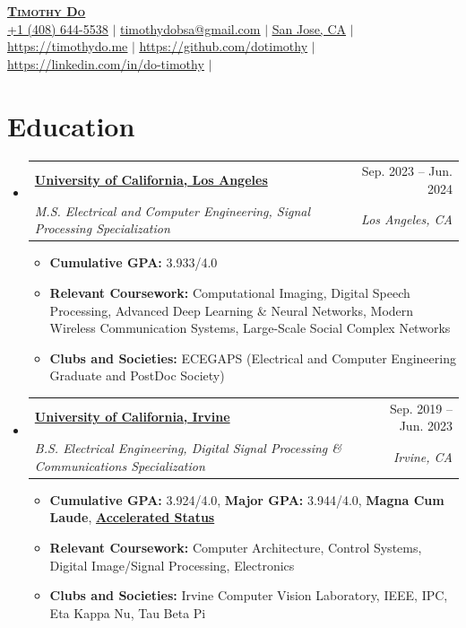 \documentclass[letterpaper,11pt]{article}
\makeatletter
\newcommand{\resumeItem}[1]{
 \item\small{
    {#1 \vspace{-2pt}}
 }
}
\newcommand{\resumeSubheading}[4]{
 \vspace{-2pt}\item
    \begin{tabular*}{0.97\textwidth}[t]{l@{\extracolsep{\fill}}r}
      \textbf{#1} & #2 \\
      \textit{\small#3} & \textit{\small #4} \\
    \end{tabular*}\vspace{-7pt}
}
\newcommand{\resumeSubHeadingListStart}{\begin{itemize}[leftmargin=0.15in, label={}]}
\newcommand{\resumeSubHeadingListEnd}{\end{itemize}\vspace{-7pt}}
\newcommand{\resumeItemListStart}{\begin{itemize}}
\newcommand{\resumeItemListEnd}{\end{itemize}\vspace{-5pt}}
\makeatother
\begin{document}

\begin{center}
    \textbf{\Huge \scshape \href{https://timothydo.me}{\underline{Timothy Do}} } \\ \vspace{4pt}
    \small \href{https://timothydo.me/contact/sms}{\underline{+1 (408) 644-5538}} $|$ 
    \href{mailto:timothydobsa@gmail.com}{\underline{timothydobsa@gmail.com}} $|$  
    \href{https://en.wikipedia.org/wiki/San_Jose,_California}{\underline{San Jose, CA}} $|$
    \\ \vspace{4pt}
    \href{https://timothydo.me}{\underline{https://timothydo.me}} $|$ 
    \href{https://github.com/dotimothy}{\underline{https://github.com/dotimothy}} $|$
    \href{https://linkedin.com/in/do-timothy}{\underline{https://linkedin.com/in/do-timothy}} $|$
    
    
\end{center}


\section{Education}
 \resumeSubHeadingListStart
    \resumeSubheading
      {\href{https://ucla.edu}{University of California, Los Angeles}}{Sep. 2023 --  Jun. 2024}
      {M.S. Electrical and Computer Engineering, Signal Processing Specialization}{Los Angeles, CA}
      \resumeItemListStart
        \resumeItem{\textbf{Cumulative GPA:} 3.933/4.0}
        \resumeItem{\textbf{Relevant Coursework:} Computational Imaging, Digital Speech Processing, Advanced Deep Learning \& Neural Networks, Modern Wireless Communication Systems, Large-Scale Social Complex Networks}
        \resumeItem{\textbf{Clubs and Societies:} ECEGAPS (Electrical and Computer Engineering Graduate and PostDoc Society) }
      \resumeItemListEnd
    \resumeSubheading
      {\href{https://uci.edu}{University of California, Irvine}}{Sep. 2019 -- Jun. 2023}
      {B.S. Electrical Engineering, Digital Signal Processing  
      \& Communications Specialization}{Irvine, CA}
      \resumeItemListStart
        \resumeItem{\textbf{Cumulative GPA:} 3.924/4.0, \textbf{Major GPA:} 3.944/4.0, \textbf{Magna Cum Laude}, \textbf{\href{https://engineering.uci.edu/admissions/graduate/accelerated-status-program}{Accelerated Status}}}
        \resumeItem{\textbf{Relevant Coursework:} Computer Architecture, Control Systems, Digital Image/Signal Processing, Electronics}
        \resumeItem{\textbf{Clubs and Societies:} Irvine Computer Vision Laboratory, IEEE, IPC, Eta Kappa Nu, Tau Beta Pi}
      \resumeItemListEnd
 \resumeSubHeadingListEnd
\end{document}
